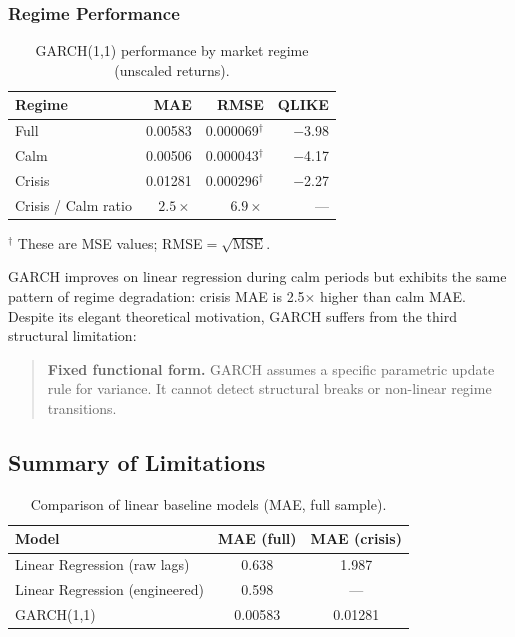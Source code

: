 \subsubsection{Regime Performance}

\begin{table}[H]
  \centering
  \caption{GARCH(1,1) performance by market regime (unscaled returns).}
  \label{tab:garch_regime}
  \begin{tabular}{lrrr}
    \toprule
    Regime  & MAE      & RMSE     & QLIKE    \\
    \midrule
    Full    & 0.00583  & 0.000069$^\dagger$ & $-$3.98 \\
    Calm    & 0.00506  & 0.000043$^\dagger$ & $-$4.17 \\
    Crisis  & 0.01281  & 0.000296$^\dagger$ & $-$2.27 \\
    \midrule
    Crisis / Calm ratio & $2.5\times$ & $6.9\times$ & --- \\
    \bottomrule
  \end{tabular}
  \par\smallskip
  \small $^\dagger$ These are MSE values; RMSE$= \sqrt{\text{MSE}}$.
\end{table}

GARCH improves on linear regression during calm periods but exhibits the same pattern
of regime degradation: crisis MAE is 2.5$\times$ higher than calm MAE. Despite its
elegant theoretical motivation, GARCH suffers from the third structural limitation:

\begin{quote}
  \textbf{Fixed functional form.} GARCH assumes a specific parametric update rule for
  variance. It cannot detect structural breaks or non-linear regime transitions.
\end{quote}

\subsection{Summary of Limitations}

\begin{table}[H]
  \centering
  \caption{Comparison of linear baseline models (MAE, full sample).}
  \label{tab:linreg_summary}
  \begin{tabular}{lcc}
    \toprule
    Model & MAE (full) & MAE (crisis) \\
    \midrule
    Linear Regression (raw lags)    & 0.638 & 1.987 \\
    Linear Regression (engineered)  & 0.598 & ---   \\
    GARCH(1,1)                      & 0.00583 & 0.01281 \\
    \bottomrule
  \end{tabular}
\end{table}

